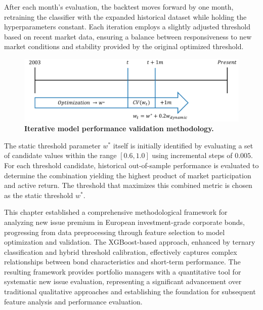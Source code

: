 After each month's evaluation, the backtest moves forward by one month, retraining the classifier with the expanded historical dataset while holding the hyperparameters constant. Each iteration employs a slightly adjusted threshold based on recent market data, ensuring a balance between responsiveness to new market conditions and stability provided by the original optimized threshold.

\begin{figure}[h]
    \begin{center}
        \includegraphics[width=\textwidth]{images/backtest_timeline.pdf}
    \end{center}
    \caption{\textbf{Iterative model performance validation methodology.}}
    \label{fig:backtest_timeline}
\end{figure}

The static threshold parameter $w^*$ itself is initially identified by evaluating a set of candidate values within the range $[0.6, 1.0]$ using incremental steps of $0.005$. For each threshold candidate, historical out-of-sample performance is evaluated to determine the combination yielding the highest product of market participation and active return. The threshold that maximizes this combined metric is chosen as the static threshold $w^*$.

This chapter established a comprehensive methodological framework for analyzing new issue premium in European investment-grade corporate bonds, progressing from data preprocessing through feature selection to model optimization and validation. The XGBoost-based approach, enhanced by ternary classification and hybrid threshold calibration, effectively captures complex relationships between bond characteristics and short-term performance. The resulting framework provides portfolio managers with a quantitative tool for systematic new issue evaluation, representing a significant advancement over traditional qualitative approaches and establishing the foundation for subsequent feature analysis and performance evaluation.